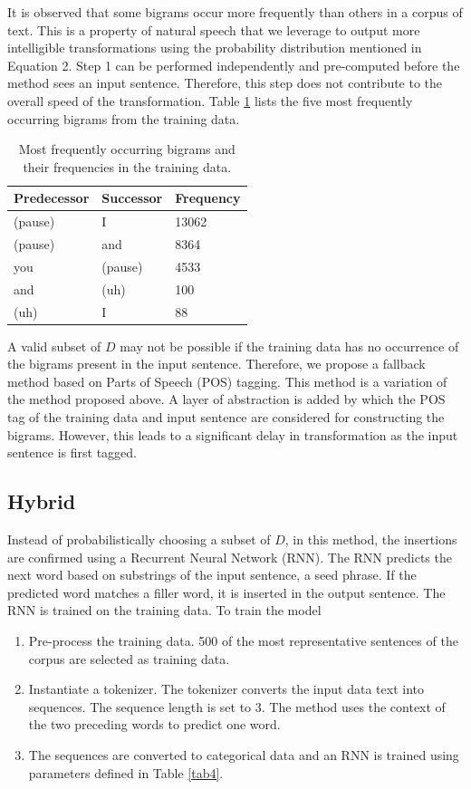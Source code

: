 \documentclass[journal]{IEEEtran}
\begin{document}
It is observed that some bigrams occur more frequently than others in a corpus of text. This is a property of natural speech that we leverage to output more intelligible transformations using the probability distribution mentioned in Equation 2. Step 1 can be performed independently and pre-computed before the method sees an input sentence. Therefore, this step does not contribute to the overall speed of the transformation. Table \ref{tab1} lists the five most frequently occurring bigrams from the training data.

\begin{table}
\caption{Most frequently occurring bigrams and their frequencies in the training data.}
\label{tab1}
\small
\setlength{\tabcolsep}{3pt}
\begin{tabular}{|p{80pt}|p{80pt}|p{80pt}|}
\hline
Predecessor& 
Successor& 
Frequency \\
\hline
(pause) & I & 13062\\
(pause) & and & 8364\\
you & (pause) & 4533\\
and & (uh) & 100\\
(uh) & I & 88\\
\hline
\end{tabular}
\label{tab1}
\end{table}

A valid subset of $D$ may not be possible if the training data has no occurrence of the bigrams present in the input sentence. Therefore, we propose a fallback method based on Parts of Speech (POS) tagging.\cite{pos} This method is a variation of the method proposed above. A layer of abstraction is added by which the POS tag of the training data and input sentence are considered for constructing the bigrams. However, this leads to a significant delay in transformation as the input sentence is first tagged.

\subsection{Hybrid}

Instead of probabilistically choosing a subset of $D$, in this method, the insertions are confirmed using a Recurrent Neural Network (RNN). The RNN predicts the next word based on substrings of the input sentence, a seed phrase. If the predicted word matches a filler word, it is inserted in the output sentence. The RNN is trained on the training data. To train the model

\begin{enumerate}
    \item Pre-process the training data. 500 of the most representative sentences of the corpus are selected as training data.
    \item Instantiate a tokenizer. The tokenizer converts the input data text into sequences. The sequence length is set to 3. The method uses the context of the two preceding words to predict one word.  
    \item The sequences are converted to categorical data and an RNN is trained using parameters defined in Table \ref{tab4}.
\end{enumerate}
\end{document}
